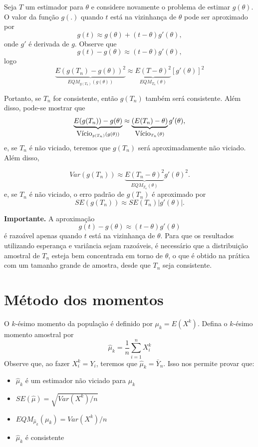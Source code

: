 \documentclass[
  letterpaper,
  DIV=11,
  numbers=noendperiod]{scrartcl}
\providecommand{\tightlist}{%
  \setlength{\itemsep}{0pt}\setlength{\parskip}{0pt}}\usepackage{longtable,booktabs,array}
\begin{document}
Seja \(T\) um estimador para \(\theta\) e considere novamente o problema
de estimar \(g(\theta)\). O valor da função \(g(.)\) quando \(t\) está
na vizinhança de \(\theta\) pode ser aproximado por
\[g(t)\approx g(\theta)+(t-\theta)g'(\theta),\] onde \(g'\) é derivada
de \(g\). Observe que \[g(t)-g(\theta)\approx (t-\theta)g'(\theta),\]
logo
\[\underbrace{E\left(g(T_n)-g(\theta)\right)^2}_{EQM_{g(T_n)}(g(\theta))}\approx \underbrace{E\left(T-\theta\right)^2}_{EQM_{T_n}(\theta)} [g'(\theta)]^2\]

Portanto, se \(T_n\) for consistente, então \(g(T_n)\) também será
consistente. Além disso, pode-se mostrar que\\
\[\underbrace{E(g(T_n))-g(\theta)}_{\hbox{Vício}_{g(T_n)}(g(\theta))}\approx \underbrace{(E(T_n )-\theta)}_{\hbox{Vício}_{T_n}(\theta)}g'(\theta),\]
e, se \(T_n\) é não viciado, teremos que \(g(T_n)\) será aproximadamente
não viciado. Além disso,

\[Var(g(T_n))\approx \underbrace{E(T_n-\theta)^2}_{EQM_{T_n}(\theta)}g'(\theta)^2.\]
e, se \(T_n\) é não viciado, o erro padrão de \(g(T_n)\) é aproximado
por \[SE(g(T_n))\approx SE(T_n)|g'(\theta)|.\]

\textbf{Importante.} A aproximação
\[g(t)-g(\theta)\approx (t-\theta)g'(\theta)\] é razoável apenas quando
\(t\) está na vizinhança de \(\theta\). Para que os resultados
utilizando esperança e variância sejam razoáveis, é necessário que a
distribuição amostral de \(T_n\) esteja bem concentrada em torno de
\(\theta\), o que é obtido na prática com um tamanho grande de amostra,
desde que \(T_n\) seja consistente.

\section{Método dos momentos}\label{muxe9todo-dos-momentos}

O \(k\)-ésimo momento da população é definido por \(\mu_k=E(X^k)\).
Defina o \(k\)-ésimo momento amostral por
\[\hat{\mu}_k=\frac{1}{n}\sum_{i=1}^n X_i^k\] Observe que, ao fazer
\(X_i^k=Y_i\), teremos que \(\hat{\mu}_k=\bar{Y}_n\). Isso nos permite
provar que:

\begin{itemize}
\tightlist
\item
  \(\hat{\mu}_k\) é um estimador não viciado para \(\mu_k\)
\item
  \(SE(\hat{\mu})=\sqrt{Var(X^k)/n}\)
\item
  \(EQM_{\hat{\mu}_k}(\mu_k)=Var(X^k)/n\)
\item
  \(\hat{\mu}_k\) é consistente
\end{itemize}
\end{document}
